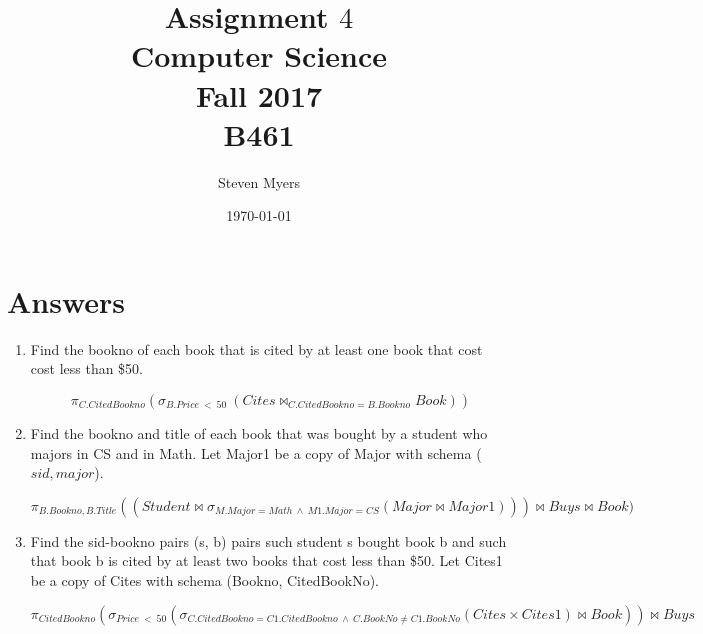 \documentclass{article}
\begin{document}
\title{Assignment $4$\\ Computer Science \\ Fall 2017\\ B461}         %
\author{Steven Myers}        %
\date{\today}          %
\maketitle

\makeatother     %

\pagestyle{plain}

\section*{Answers}

\begin{enumerate}
    \item %
    Find the bookno of each book that is cited by at least one book that cost cost less than \$50.

    \begin{displaymath}
            \pi_{C.CitedBookno}(\sigma_{B.Price\ <\ 50}\ (Cites\bowtie_{C.CitedBookno=B.Bookno} Book))
    \end{displaymath}

    \item %
    Find the bookno and title of each book that was bought by a student who majors in CS and in Math. Let Major1 be a copy of Major with schema ($sid,major$).

    \begin{displaymath}
        \pi_{B.Bookno, B.Title}((Student \bowtie \sigma_{M.Major=Math\ \wedge\ M1.Major=CS} (Major \bowtie Major1))) \bowtie Buys \bowtie Book)

    \end{displaymath}

    \item %
    Find the sid-bookno pairs (s, b) pairs such student s bought book b and
    such that book b is cited by at least two books that cost less than \$50. Let Cites1 be a copy of Cites with schema (Bookno, CitedBookNo).

    \begin{displaymath}
        \pi_{CitedBookno}(\sigma_{Price\ <\ 50} (\sigma_{C.CitedBookno=C1.CitedBookno\ \wedge\ C.BookNo \ne C1.BookNo}(Cites \times Cites1) \bowtie Book)) \bowtie Buys
    \end{displaymath}

\end{enumerate}
\end{document}
